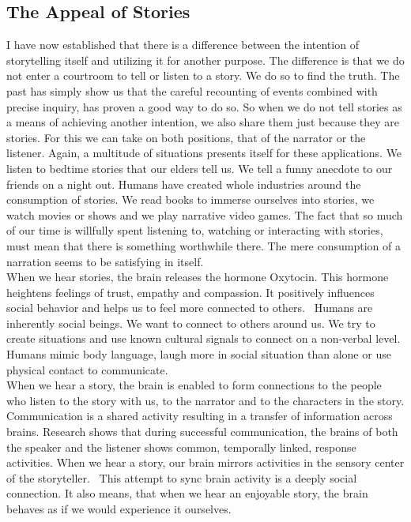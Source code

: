 \subsection{The Appeal of Stories}
I have now established that there is a difference between the intention of storytelling itself and utilizing it for another purpose. The difference is that we do not enter a courtroom to tell or listen to a story. We do so to find the truth. The past has simply show us that the careful recounting of events combined with precise inquiry, has proven a good way to do so. So when we do not tell stories as a means of achieving another intention, we also share them just because they are stories. For this we can take on both positions, that of the narrator or the listener. Again, a multitude of situations presents itself for these applications. We listen to bedtime stories that our elders tell us. We tell a funny anecdote to our friends on a night out. Humans have created whole industries around the consumption of stories. We read books to immerse ourselves into stories, we watch movies or shows and we play narrative video games. The fact that so much of our time is willfully spent listening to, watching or interacting with stories, must mean that there is something worthwhile there. The mere consumption of a narration seems to be satisfying in itself.\\
When we hear stories, the brain releases the hormone Oxytocin. This hormone heightens feelings of trust, empathy and compassion. It positively influences social behavior and helps us to feel more connected to others.~\cite{Gottschall2012} Humans are inherently social beings. We want to connect to others around us. We try to create situations and use known cultural signals to connect on a non-verbal level. Humans mimic body language, laugh more in social situation than alone or use physical contact to communicate.~\cite{Frith2007}\\
When we hear a story, the brain is enabled to form connections to the people who listen to the story with us, to the narrator and to the characters in the story. Communication is a shared activity resulting in a transfer of information across brains. Research shows that during successful communication, the brains of both the speaker and the listener shows common, temporally linked, response activities. When we hear a story, our brain mirrors activities in the sensory center of the storyteller.~\cite{Stephens2010} This attempt to sync brain activity is a deeply social connection. It also means, that when we hear an enjoyable story, the brain behaves as if we would experience it ourselves.
